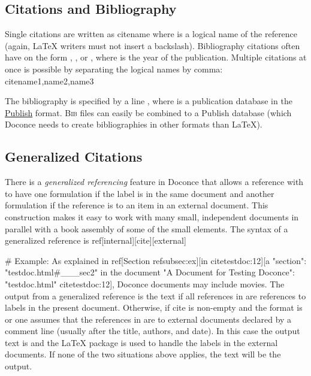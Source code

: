 \documentclass[%
oneside,                 %
final,                   %
10pt]{article}
\begin{document}
\subsection{Citations and Bibliography}

Single citations are written as
\bccq
cite{name}
\eccq
where  is a logical name
of the reference (again, {\LaTeX} writers must not insert a backslash).
Bibliography citations often have  on the form
, , or , where
 is the year of the publication.
Multiple citations at once is possible by separating the logical names
by comma:
\bccq
cite{name1,name2,name3}
\eccq

The bibliography is specified by a line ,
where  is a publication database in the
\href{{https://bitbucket.org/logg/publish}}{Publish} format.
\textsc{Bib}\negthinspace{\TeX}  files can easily be combined to a Publish database
(which Doconce needs to create bibliographies in other formats
than {\LaTeX}).

\subsection{Generalized Citations}

There is a \emph{generalized referencing} feature in Doconce that allows
a reference with  to have one formulation if the label is
in the same document and another formulation if the reference is
to an item in an external document. This construction makes it easy
to work with many small, independent documents in parallel with
a book assembly of some of the small elements.
The syntax of a generalized reference is
\bccq
ref[internal][cite][external]

# Example:
As explained in
ref[Section ref{subsec:ex}][in cite{testdoc:12}][a "section":
"testdoc.html#___sec2" in the document
"A Document for Testing Doconce": "testdoc.html" cite{testdoc:12}],
Doconce documents may include movies.
\eccq
The output from a generalized reference is the text  if all
 references in  are references to labels in the
present document. Otherwise, if cite is non-empty and the format is
 or  one assumes that the references in 
are to external documents declared by a comment line  (usually after the title, authors,
and date). In this case the output text is  and the
{\LaTeX} package  is used to handle the labels in the external
documents.  If none of the two situations above applies, the
 text will be the output.
\end{document}
